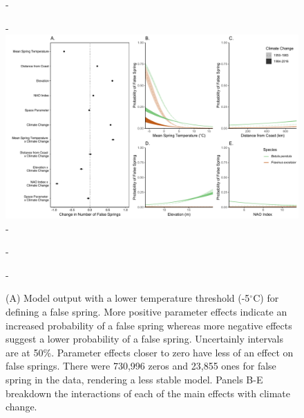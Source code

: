 \documentclass{article}\usepackage[]{graphicx}\usepackage[]{color}
\begin{document}
{\begin{figure} [H]
  -\begin{center}
  -\includegraphics[width=12cm]{..//figures/MainModel_wAPCplots_five.pdf}
  -\caption{(A) Model output with a lower temperature threshold (-5$^{\circ}$C) for defining a false spring. More positive parameter effects indicate an increased probability of a false spring whereas more negative effects suggest a lower probability of a false spring. Uncertainly intervals are at 50\%. Parameter effects closer to zero have less of an effect on false springs. There were 730,996 zeros and 23,855 ones for false spring in the data, rendering a less stable model. Panels B-E breakdown the interactions of each of the main effects with climate change. }\label{fig:five}
  -\end{center}
  -\end{figure}}
  

\end{document}
